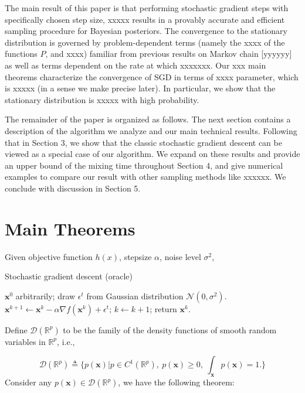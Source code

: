 \documentclass[preprint,12pt,3p]{elsarticle}
\newcommand{\bx}{\mathbf{x}}
\newcommand{\R}{\mathbb{R}}
\newcommand{\D}{\mathscr{D}}
\newcommand{\N}{\mathscr{N}}
\begin{document}
The main result of this paper is that performing stochastic gradient steps with specifically chosen step size, xxxxx results in a provably accurate and efficient sampling procedure for Bayesian posteriors. The convergence to the stationary distribution is governed by problem-dependent terms (namely the xxxx of the functions $P$, and xxxx) familiar from previous results on Markov chain [yyyyyy] as well as terms dependent on the rate at which xxxxxxx. Our xxx main theorems characterize the convergence of SGD in terms of xxxx parameter, which is xxxxx (in a sense we make precise later). In particular, we show that the stationary distribution is xxxxx with high probability.

The remainder of the paper is organized as follows. The next section contains a description of the algorithm we analyze and our main technical results. Following that in Section 3, we show that the classic stochastic gradient descent can be viewed as a special case of our algorithm. We expand on these results and provide an upper bound of the mixing time throughout Section 4, and give numerical examples to compare our result with other sampling methods like xxxxxx. We conclude with discussion in Section 5.



\section{Main Theorems}

\begin{algorithm}
{\small
Given objective function $h(x)$, stepsize $\alpha$, noise level $\sigma^2$,
\begin{algorithmic}\caption{Stochastic gradient descent (oracle)}\label{Alg:SGD}
 $ \bx^0$ arbitrarily;
\STATE draw $\epsilon^t$ from Gaussian distribution $\N(0, \sigma^2)$.
\STATE
$\bx^{k+1} \gets \bx^k - \alpha\nabla f(\bx^k) + \epsilon^t$;
\STATE $k\gets k+1$;
\ENDWHILE
\STATE return $\bx^k$.
\end{algorithmic}}
\end{algorithm}

Define $\D(\R^p)$ to be the family of the density functions of smooth random variables in $\R^p$, i.e.,

\begin{equation}
\D(\R^p)\triangleq \{p(\bx)\Big| p\in C^1(\R^p),~p(\bx) \geq 0,~ \int_\bx p(\bx) = 1.\}
\end{equation}
Consider any $p(\bx)\in \D(\R^p)$, we have the following theorem:
\end{document}
